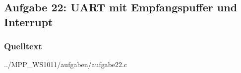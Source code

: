 \subsection*{Aufgabe 22: UART mit Empfangspuffer und Interrupt}

\subsubsection*{Quelltext}

{../MPP_WS1011/aufgaben/aufgabe22.c}
